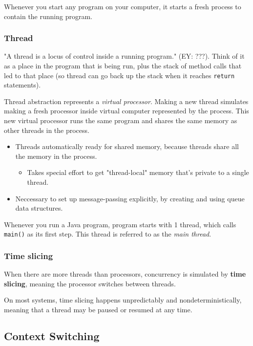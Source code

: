\documentclass[10pt]{amsart}
\begin{document}
\begin{multicols*}{2}
Whenever you start any program on your computer, it starts a fresh process to contain the running program. \\

\subsubsection{Thread}

"A thread is a locus of control inside a running program." (EY: ???). Think of it as a place in the program that is being run, plus the stack of method calls that led to that place (so thread can go back up the stack when it reaches \texttt{return} statements).

Thread abstraction represents a \emph{virtual processor}. Making a new thread simulates making a fresh processor inside virtual computer represented by the process. This new virtual processor runs the same program and shares the same memory as other threads in the process.

\begin{itemize}
	\item Threads automatically ready for shared memory, because threads share all the memory in the process.
	\begin{itemize}
		\item Takes special effort to get "thread-local" memory that's private to a single thread.		
	\end{itemize}
\item Neccessary to set up message-passing explicitly, by creating and using queue data structures.
\end{itemize}

Whenever you run a Java program, program starts with 1 thread, which calls \verb|main()| as its first step. This thread is referred to as the \emph{main thread}.

\subsubsection{Time slicing}

When there are more threads than processors, concurrency is simulated by \textbf{time slicing}, meaning the processor switches between threads.

On most systems, time slicing happens unpredictably and nondeterministically, meaning that a thread may be paused or resumed at any time.

\subsection{Context Switching}


\end{multicols*}
\end{document}
